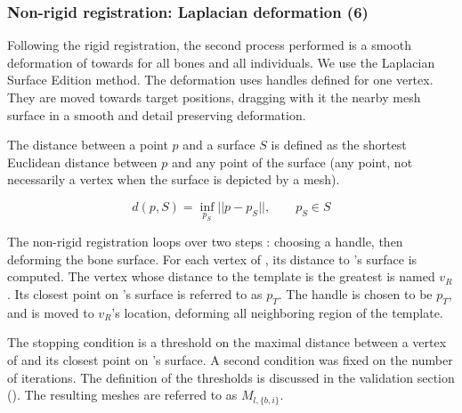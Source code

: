 \subsubsection{Non-rigid registration: Laplacian deformation (6)}
\label{ssubsec:laplacian}


Following the rigid registration, the second process performed is a smooth deformation of \mt* towards \mr* for all bones and all individuals. We use the Laplacian Surface Edition method. 
The deformation uses handles defined for one vertex. They are moved towards target positions, dragging with it the nearby mesh surface in a smooth and detail preserving deformation. 


The distance between a point $p$ and a surface $S$ is defined as the shortest Euclidean distance between $p$ and any point of the surface (any point, not necessarily a vertex when the surface is depicted by a mesh). 

\begin{equation}
	d(p, S) = \inf_{p_S} || p-p_S||, \qquad   p_S \in S
\end{equation}


The non-rigid registration loops over two steps : choosing a handle, then deforming the bone surface.
For each vertex of \mr*, its distance to \mt*'s surface is computed. The vertex whose distance to the template is the greatest is named $v_R$. Its closest point on  \mt*'s surface is referred to as $p_T$. The handle is chosen to be $p_T$, and is moved to $v_R$'s location, deforming all neighboring region of the template. 

The stopping condition is a threshold on the maximal distance between a vertex of \mt* and its closest point on \mr*'s surface. A second condition was fixed on the number of iterations. The definition of the thresholds is discussed in the validation section (). The resulting meshes are referred to as $M_{l,\{b,i\}}$. 


